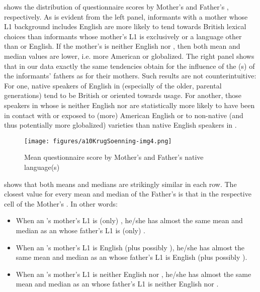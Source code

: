 \documentclass[output=paper]{langsci/langscibook}
\begin{document}
 shows the distribution of questionnaire scores by Mother’s and Father’s , respectively. As is evident from the left panel, informants with a mother whose L1 background includes English are more likely to tend towards British lexical choices than informants whose mother’s L1 is exclusively  or a language other than  or English. If the mother’s  is neither English nor , then both mean and median values are lower, i.e. more American or globalized. The right panel shows that in our data exactly the same tendencies obtain for the influence of the (s) of the informants’ fathers as for their mothers. Such results are not counterintuitive: For one, native speakers of English in  (especially of the older, parental generations) tend to be British or oriented towards  usage. For another, those speakers in  whose  is neither English nor  are statistically more likely to have been in contact with or exposed to (more) American English or to non-native (and thus potentially more globalized) varieties than native English speakers in .


\begin{figure}[t]
\texttt{[image: figures/a10KrugSoenning-img4.png]}
\caption{Mean questionnaire score by Mother’s and Father’s native language(s)}
\label{fig:krug:4}
\end{figure}

 shows that both means and medians are strikingly similar in each row. The closest value for every mean and median of the Father’s  is that in the respective cell of the Mother’s . In other words:

\largerpage[1.5]
\begin{itemize}
\item When an ’s mother’s L1 is (only) , he/she has almost the same mean and median as an  whose father’s L1 is (only) .
\item When an ’s mother’s L1 is English (plus possibly ), he/she has almost the same mean and median as an  whose father’s L1 is English (plus possibly ).
\item When an ’s mother’s L1 is neither English nor , he/she has almost the same mean and median as an  whose father’s L1 is neither English nor .
\end{itemize}
\newpage 
\end{document}
